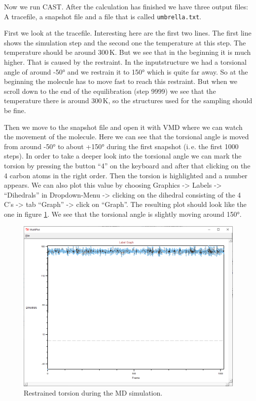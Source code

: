 \documentclass[a4paper,11pt]{scrartcl}
\begin{document}
Now we run CAST. After the calculation has finished we have three output files: A tracefile, a snapshot file and a file that is called \texttt{umbrella.txt}.

First we look at the tracefile. Interesting here are the first two lines. The first line shows the simulation step and the second one the temperature at this step. The temperature should be around 300\,K. But we see that in the beginning it is much higher. That is caused by the restraint. In the inputstructure we had a torsional angle of around -50° and we restrain it to 150° which is quite far away. So at the beginning the molecule has to move fast to reach this restraint. But when we scroll down to the end of the equilibration (step 9999) we see that the temperature there is around 300\,K, so the structures used for the sampling should be fine.

Then we move to the snapshot file and open it with VMD where we can watch the movement of the molecule. Here we can see that the torsional angle is moved from around -50° to about +150° during the first snapshot (i.\,e. the first 1000 steps). In order to take a deeper look into the torsional angle we can mark the torsion by pressing the button ``4'' on the keyboard and after that clicking on the 4 carbon atoms in the right order. Then the torsion is highlighted and a number appears. We can also plot this value by choosing Graphics -> Labels -> ``Dihedrals'' in Dropdown-Menu -> clicking on the dihedral consisting of the 4 C's -> tab ``Graph'' -> click on ``Graph''. The resulting plot should look like the one in figure \ref{fig:umbrella_torsion}. We see that the torsional angle is slightly moving around 150°.

\begin{figure}[htb]
	\center
	\includegraphics[width=\textwidth]{Img/umbrella_torsion.png}\caption{Restrained torsion during the MD simulation.}
	\label{fig:umbrella_torsion}
\end{figure}
\end{document}
